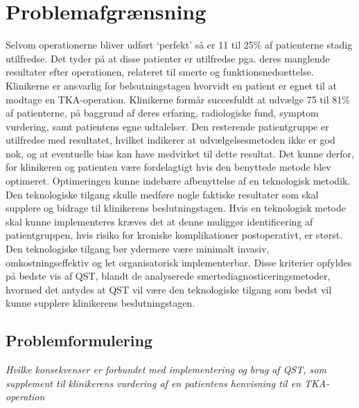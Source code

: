 \newpage \section{Problemafgrænsning}
Selvom operationerne bliver udført ‘perfekt’ så er 11 til 25\% af patienterne stadig utilfredse. Det tyder på at disse patienter er utilfredse pga. deres manglende resultater efter operationen, relateret til smerte og funktionsnedsættelse. Klinikerne er ansvarlig for belsutningstagen hvorvidt en patient er egnet til at modtage en TKA-operation. Klinikerne formår succesfuldt at udvælge 75 til 81\% af patienterne, på baggrund af deres erfaring, radiologiske fund, symptom vurdering, samt patientens egne udtalelser. Den resterende patientgruppe er utilfredse med resultatet, hvilket indikerer at udvælgelsesmetoden ikke er god nok, og at eventuelle bias kan have medvirket til dette resultat. Det kunne derfor, for klinikeren og patienten være fordelagtigt hvis den benyttede metode blev optimeret. Optimeringen kunne indebære afbenyttelse af en teknologisk metodik. Den teknologiske tilgang skulle medføre nogle faktiske resultater som skal supplere og bidrage til klinikerens beslutningstagen. Hvis en teknologisk metode skal kunne implementeres kræves det at denne muliggør identificering af patientgruppen, hvis risiko for kroniske komplikationer postoperativt, er størst. Den teknologiske tilgang bør ydermere være minimalt invasiv, omkostningseffektiv og let organisatorisk implementerbar. Disse kriterier opfyldes på bedste vis af QST, blandt de analyserede smertediagnosticeringsmetoder, hvormed det antydes at QST vil være den teknologiske tilgang som bedst vil kunne supplere klinikerens beslutningstagen. 

\subsection{Problemformulering}
\begin{center}
	\textit{Hvilke konsekvenser er forbundet med implementering og brug af QST, som supplement til klinikerens vurdering af en patientens henvisning til en TKA-operation}
\end{center}